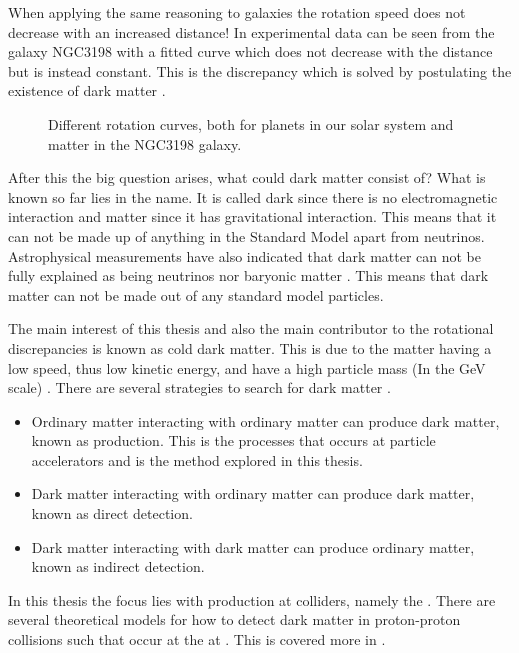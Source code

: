 When applying the same reasoning to galaxies the rotation speed does not decrease with an increased distance! In  experimental data can be seen from the galaxy NGC3198 with a fitted curve which does not decrease with the distance but is instead constant.  This is the discrepancy which is solved by postulating the existence of dark matter \citep{1933AcHPh}.
 \begin{figure}[h] %
    \hfill
    \caption{Different rotation curves, both for planets in our solar system and matter in the NGC3198 galaxy.}
    \label{fig:rotation}
  \end{figure}
After this the big question arises, what could dark matter consist of? What is known so far lies in the name. It is called dark since there is no electromagnetic interaction and matter since it has gravitational interaction. This means that it can not be made up of anything in the Standard Model apart from neutrinos. Astrophysical measurements have also indicated that dark matter can not be fully explained as being neutrinos nor baryonic matter \citep{Gondolo:2003}. This means that dark matter can not be made out of any standard model particles. 

The main interest of this thesis and also the main contributor to the rotational discrepancies is known as cold dark matter. This is due to the matter having a low speed, thus low kinetic energy, and have a high particle mass (In the GeV scale) \citep{Goodman:2010,CERN-PH-EP-2012-210,Jungman:1996}.
There are several strategies to search for dark matter \citep{Jungman:1996}.
\begin{itemize}
\item Ordinary matter interacting with ordinary matter can produce dark matter, known as production. This is the processes that occurs at particle accelerators and is the method explored in this thesis.
\item Dark matter interacting with ordinary matter can produce dark matter, known as direct detection.
\item Dark matter interacting with dark matter can produce ordinary matter, known as indirect detection.
\end{itemize} 
In this thesis the focus lies with production at colliders, namely the \abbrLHC . There are several theoretical models for how to detect dark matter in proton-proton collisions such that occur at the \abbrLHC at \abbrCERN. This is covered more in . 

